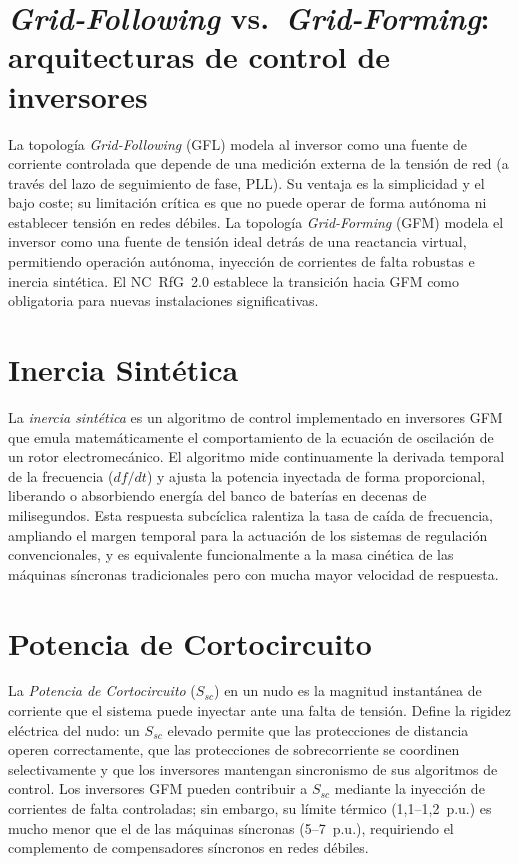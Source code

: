 \section{\textit{Grid-Following} vs.\ \textit{Grid-Forming}: arquitecturas
de control de inversores}
\label{anexo:grid_following}
La topología \textit{Grid-Following} (GFL) modela al inversor como una
fuente de corriente controlada que depende de una medición externa de la
tensión de red (a través del lazo de seguimiento de fase, PLL). Su
ventaja es la simplicidad y el bajo coste; su limitación crítica es que
no puede operar de forma autónoma ni establecer tensión en redes débiles.
La topología \textit{Grid-Forming} (GFM) modela el inversor como una
fuente de tensión ideal detrás de una reactancia virtual, permitiendo
operación autónoma, inyección de corrientes de falta robustas e inercia
sintética. El NC~RfG~2.0 establece la transición hacia GFM como
obligatoria para nuevas instalaciones significativas.

\section{Inercia Sintética}
\label{anexo:inercia_sintetica}
La \textit{inercia sintética} es un algoritmo de control implementado en
inversores GFM que emula matemáticamente el comportamiento de la ecuación
de oscilación de un rotor electromecánico. El algoritmo mide
continuamente la derivada temporal de la frecuencia ($df/dt$) y ajusta
la potencia inyectada de forma proporcional, liberando o absorbiendo
energía del banco de baterías en decenas de milisegundos. Esta respuesta
subcíclica ralentiza la tasa de caída de frecuencia, ampliando el margen
temporal para la actuación de los sistemas de regulación convencionales,
y es equivalente funcionalmente a la masa cinética de las máquinas
síncronas tradicionales pero con mucha mayor velocidad de respuesta.

\section{Potencia de Cortocircuito}
\label{anexo:potencia_cortocircuito}
La \textit{Potencia de Cortocircuito} ($S_{sc}$) en un nudo es la
magnitud instantánea de corriente que el sistema puede inyectar ante una
falta de tensión. Define la rigidez eléctrica del nudo: un $S_{sc}$
elevado permite que las protecciones de distancia operen correctamente,
que las protecciones de sobrecorriente se coordinen selectivamente y que
los inversores mantengan sincronismo de sus algoritmos de control. Los
inversores GFM pueden contribuir a $S_{sc}$ mediante la inyección de
corrientes de falta controladas; sin embargo, su límite térmico
(1{,}1--1{,}2~p.u.) es mucho menor que el de las máquinas síncronas
(5--7~p.u.), requiriendo el complemento de compensadores síncronos en
redes débiles.

